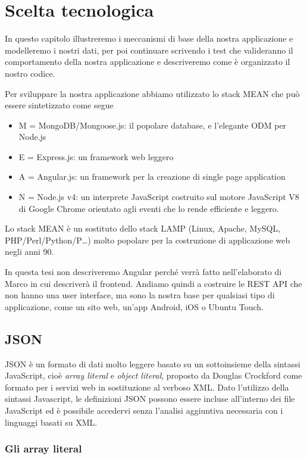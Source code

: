 \chapter{Scelta tecnologica}
\label{chap:scelta}
\nocite{rest}

In questo capitolo illustreremo i meccanismi di base della nostra applicazione e modelleremo i nostri dati, per poi continuare scrivendo i test che valideranno il comportamento della nostra applicazione e descriveremo come è organizzato il nostro codice.


Per sviluppare la nostra applicazione abbiamo utilizzato lo stack MEAN che può essere sintetizzato come segue
\begin{itemize}
\item M = MongoDB/Mongoose.js: il popolare database, e l'elegante ODM per Node.js
\item E = Express.js: un framework web leggero
\item A = Angular.js: un framework per la creazione di single page application
\item N = Node.js v4: un interprete JavaScript costruito sul motore JavaScript V8 di Google Chrome orientato agli eventi che lo rende efficiente e leggero.
\end{itemize}
Lo stack MEAN è un sostituto dello stack LAMP (Linux, Apache, MySQL, PHP/Perl/Python/P…) molto popolare per la costruzione di applicazione web negli anni 90.

In questa tesi non descriveremo Angular perché verrà fatto nell'elaborato di Marco in cui descriverà il frontend. 
Andiamo quindi a costruire le REST API che non hanno una user interface, ma sono la nostra base per qualsiasi tipo di applicazione, come un sito web, un'app Android, iOS o Ubuntu Touch.

\section{JSON}
\nocite{ajax}
JSON è un formato di dati molto leggere basato su un sottoinsieme della sintassi JavaScript, cioè \emph{array literal} e \emph{object literal}, proposto da Douglas Crockford come formato per i servizi web in sostituzione al verboso XML.
Dato l'utilizzo della sintassi Javascript, le definizioni JSON possono essere incluse all'interno dei file JavaScript ed è possibile accedervi senza l'analisi aggiuntiva necessaria con i linguaggi basati su XML.
\subsection{Gli array literal}

